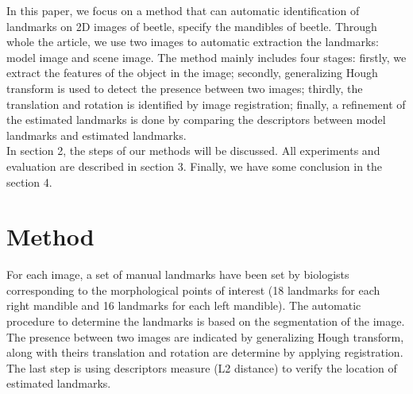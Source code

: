 \documentclass[twoside,twocolumn,10pt]{article}
\begin{document}
In this paper, we focus on a method that can automatic identification of landmarks on 2D images of beetle, specify the mandibles of beetle. Through whole the article, we use two images to automatic extraction the landmarks: model image and scene image. The method mainly includes four stages: firstly, we extract the features of the object in the image; secondly, generalizing Hough transform is used to detect the presence between two images; thirdly, the translation and rotation is identified by image registration; finally, a refinement of the estimated landmarks is done by comparing the descriptors  between model landmarks and estimated landmarks.\\[0.2cm]
In section 2, the steps of our methods will be discussed. All experiments and evaluation are described in section 3. Finally, we have some conclusion in the section 4.

\section{Method}
For each image, a set of manual landmarks have been set by biologists corresponding to the morphological points of interest (18 landmarks for each right mandible and 16 landmarks for each left mandible). The automatic procedure to determine the landmarks is based on the segmentation of the image. The presence between two images are indicated by generalizing Hough transform, along with theirs translation and rotation are determine by applying registration. The last step is using descriptors measure (L2 distance) to verify the location of estimated landmarks.
\end{document}
